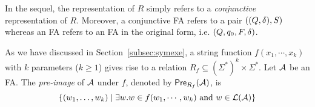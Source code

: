

In the sequel, %
the representation of $R$ simply refers to a \emph{conjunctive} representation of $R$. Moreover, a conjunctive FA refers to a pair $((Q, \delta), S)$ whereas an FA refers to an FA in the original form, i.e. $(Q, q_0, F, \delta)$.

\medskip

As we have discussed in Section~\ref{subsec:symexe}, a string function $f(x_1, \cdots, x_k)$ with $k$ parameters ($k\geq 1$) gives rise to a relation $R_f\subseteq (\Sigma^*)^k\times \Sigma^*$. Let $\mathcal{A}$ be an FA. The \emph{pre-image} of $\mathcal{A}$ under $f$, denoted by $\textsf{Pre}_{R_f}(\mathcal{A})$, is 
\[\left\{(w_1,\ldots, w_k) \mid \exists w. w\in f(w_1, \cdots, w_k)\text{ and } w\in\mathcal{L}(\mathcal{A}) \right\}\]

